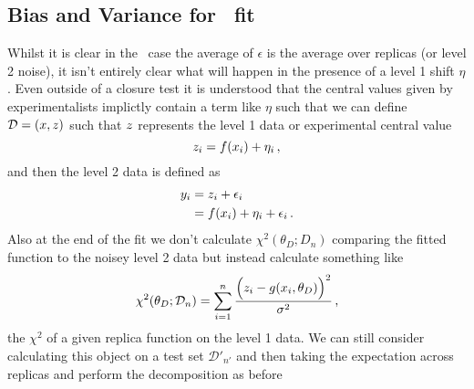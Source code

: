 \subsection{Bias and Variance for \nnpdf\ fit}

Whilst it is clear in the \nnpdf\ case the average of $\epsilon$ is the average
over replicas (or level 2 noise), it isn't entirely clear what will happen in
the presence of a level 1 shift $\eta$. Even outside of a closure test it is
understood that the central values given by experimentalists implictly contain
a term like $\eta$ such that we can define $\mathcal{D} = (x, z)$ such that
$z$ represents the level 1 data or experimental central value
\begin{equation}
    \label{eq:DefLev1}
    z_{i} = f(x_i) + \eta_i \, ,
\end{equation}
and then the level 2 data is defined as
\begin{align}
    \label{eq:DefLev2}
    y_{i} &= z_i + \epsilon_i \\
    &= f(x_i) + \eta_i  + \epsilon_i \, .
\end{align}
Also at the end of the fit we don't calculate $\chi^2(\theta_D; D_n)$ comparing
the fitted function to the noisey level 2 data but instead calculate something
like
\begin{equation}
    \label{eq:DefRepChi2}
    \chi^2(\theta_D; \mathcal{D}_{n}) = \sum_{i=1}^{n}
    \frac{\Big(
        z_i - g(x_i,\theta_D)
    \Big)^2}{\sigma^2}\, ,
\end{equation}
the $\chi^2$ of a given replica function on the level 1 data. We can still
consider calculating this object on a test set $\mathcal{D}'_{n'}$ and then
taking the expectation across replicas and perform the decomposition as before
